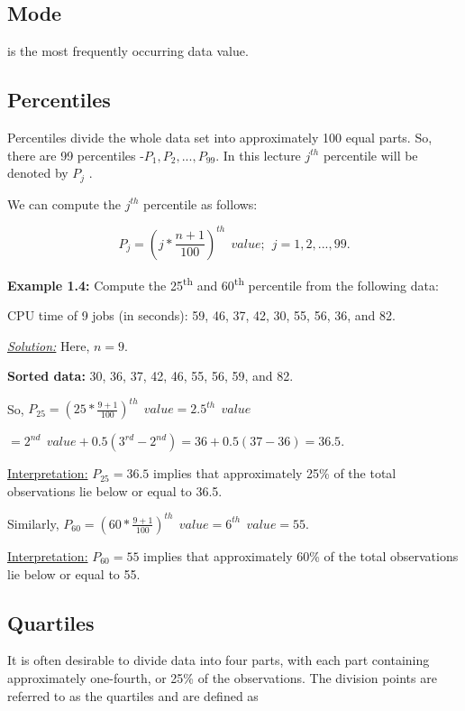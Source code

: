 \documentclass[
  11pt,
  letterpaper,
  DIV=11,
  numbers=noendperiod]{scrreprt}
\begin{document}
\subsection{\texorpdfstring{\textbf{Mode}}{Mode}}\label{mode}

is the most frequently occurring data value.

\subsection{Percentiles}\label{percentiles}

Percentiles divide the whole data set into approximately 100 equal
parts. So, there are 99 percentiles -\(P_1, P_2,...,P_{99}\). In this
lecture \(j^{th}\) percentile will be denoted by \(P_j\) .

We can compute the \(j^{th}\) percentile as follows:

\[P_j=(j*\frac{n+1}{100})^{th} \ \ value; \ \ j=1,2,...,99.\]

\textbf{Example 1.4:} Compute the 25\textsuperscript{th} and
60\textsuperscript{th} percentile from the following data:

CPU time of 9 jobs (in seconds): 59, 46, 37, 42, 30, 55, 56, 36, and 82.

\ul{\emph{Solution:}} Here, \(n=9\).

\textbf{Sorted data:} 30, 36, 37, 42, 46, 55, 56, 59, and 82.

So, \(P_{25}=(25*\frac{9+1}{100})^{th} \ \ value=2.5^{th} \ \ value\)

\(=2^{nd} \ \ value +0.5(3^{rd}-2^{nd})=36+0.5(37-36)=36.5\).

\ul{Interpretation:} \(P_{25}=36.5\) implies that approximately 25\% of
the total observations lie below or equal to 36.5.

Similarly,
\(P_{60}=(60*\frac{9+1}{100})^{th}\ \ value=6^{th}\ \ value=55\).

\ul{Interpretation:} \(P_{60}=55\) implies that approximately 60\% of
the total observations lie below or equal to 55.

\subsection{Quartiles}\label{quartiles}

It is often desirable to divide data into four parts, with each part
containing approximately one-fourth, or 25\% of the observations. The
division points are referred to as the quartiles and are defined as
\end{document}
